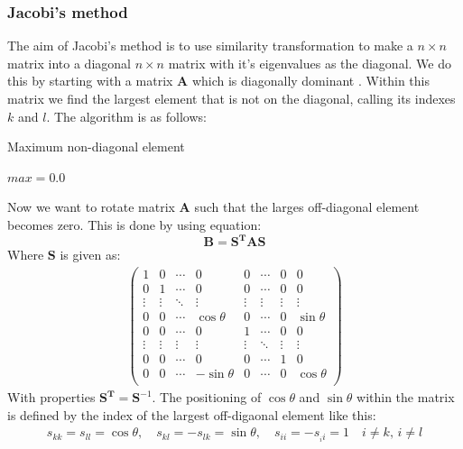 \documentclass{article}
\newcommand\ppmat[1]{\begin{pmatrix}#1\end{pmatrix}}
\newcommand{\V}[1]{\mathbf{#1}}
\begin{document}
\subsubsection{Jacobi's method}
The aim of Jacobi's method is to use similarity transformation to make a $n \times n$ matrix into a diagonal $n \times n$ matrix with it's eigenvalues as the diagonal. We do this by starting with a matrix $\V{A}$ which is diagonally dominant \cite{DDMatrix}. Within this matrix we find the largest element that is not on the diagonal, calling its indexes $k$ and $l$. The algorithm is as follows:
\begin{algorithm}[H]
\small
\caption{Maximum non-diagonal element}\label{alg:max_offdiag}
\begin{algorithmic}[1]
\State $max = 0.0$
\EndIf
\EndFor
\EndFor
\end{algorithmic}
\end{algorithm}
Now we want to rotate matrix $\V{A}$ such that the larges off-diagonal element becomes zero. This is done by using equation:
\begin{equation}
\V{B} = \V{S}^{\V{T}} \V{A} \V{S}
\label{eq:symtrans}
\end{equation}
Where $\V{S}$ is given as:
\begin{align*}
\ppmat{1 & 0 & \cdots & 0 & 0 & \cdots & 0 & 0 \\
	   0 & 1 & \cdots & 0 & 0 & \cdots & 0 & 0 \\
	   \vdots & \vdots & \ddots & \vdots & \vdots & \vdots & \vdots & \vdots \\
	   0 & 0 & \cdots & \cos \theta & 0 & \cdots & 0 & \sin \theta \\
	   0 & 0 & \cdots & 0 & 1 & \cdots & 0 & 0 \\
	   \vdots & \vdots & \vdots & \vdots & \vdots & \ddots & \vdots & \vdots \\
	   0 & 0 & \cdots & 0 & 0 & \cdots & 1 & 0 \\
	   0 & 0 & \cdots & -\sin \theta & 0 & \cdots & 0 & \cos \theta \\}
\end{align*}
With properties $\V{S}^{\V{T}} = \V{S}^{-1}$.
The positioning of $\cos \theta$ and $\sin \theta$ within the matrix is defined by the index of the largest off-digaonal element like this:
\begin{align*}
s_{kk} = s_{ll} = \cos\theta , \quad s_{kl} = -s_{lk} = \sin \theta, \quad s_{ii} = -s_{_ii} = 1 \quad i \neq k, \, i \neq l
\end{align*}
\end{document}
